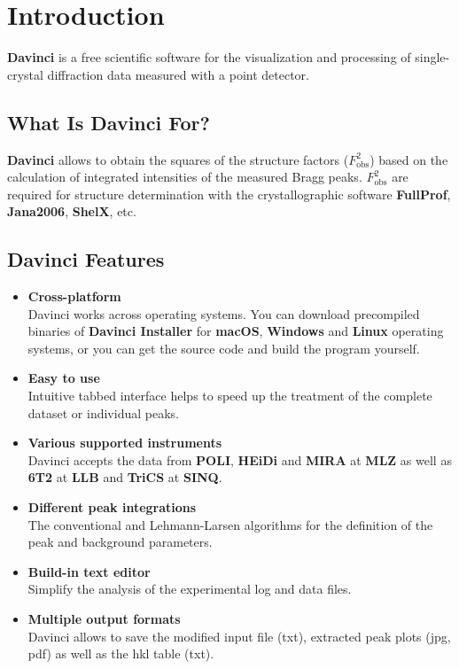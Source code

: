 \chapter{Introduction}

\textbf{Davinci} is a free scientific software for the visualization and processing of single-crystal diffraction data measured with a point detector.

\section{What Is Davinci For?}

\textbf{Davinci} allows to obtain the squares of the structure factors (\(F^2_\text{obs}\)) based on the calculation of integrated intensities of the measured Bragg peaks. \(F^2_\text{obs}\) are required for structure determination with the crystallographic software \textbf{FullProf}, \textbf{Jana2006}, \textbf{ShelX}, etc.

\section{Davinci Features}

\begin{itemize}
	\item \textbf{Cross-platform}\\	
	Davinci works across operating systems. You can download precompiled binaries of \textbf{Davinci Installer} for \textbf{macOS}, \textbf{Windows} and \textbf{Linux} operating systems, or you can get the source code and build the program yourself.
	\item \textbf{Easy to use}\\
	Intuitive tabbed interface helps to speed up the treatment of the complete dataset or individual peaks.
	\item \textbf{Various supported instruments}\\
	Davinci accepts the data from \textbf{POLI}, \textbf{HEiDi} and \textbf{MIRA} at \textbf{MLZ} as well as \textbf{6T2} at \textbf{LLB} and \textbf{TriCS} at \textbf{SINQ}.
	\item \textbf{Different peak integrations}\\
	The conventional and Lehmann-Larsen algorithms for the definition of the peak and background parameters.
	\item \textbf{Build-in text editor}\\
	Simplify the analysis of the experimental log and data files.
	\item \textbf{Multiple output formats}\\
	Davinci allows to save the modified input file (txt), extracted peak plots (jpg, pdf) as well as the hkl table (txt).
\end{itemize}